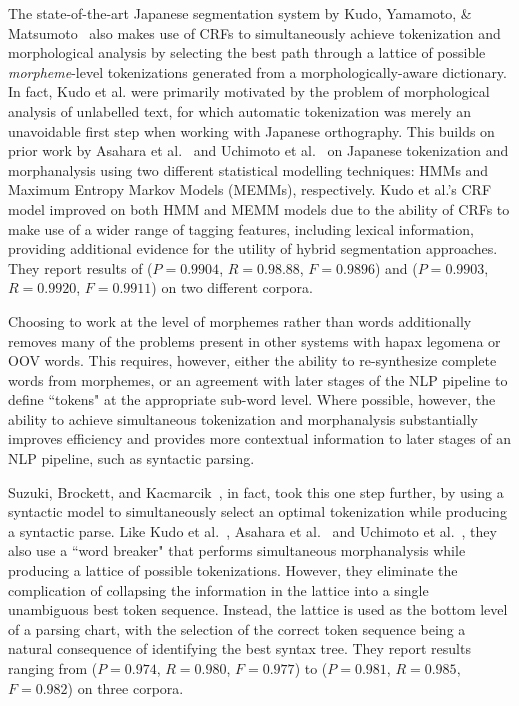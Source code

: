 The state-of-the-art Japanese segmentation system by Kudo, Yamamoto, \& Matsumoto~\cite{kudo04} also makes use of CRFs to simultaneously achieve tokenization and morphological analysis by selecting the best path through a lattice of possible \textit{morpheme}-level tokenizations generated from a morphologically-aware dictionary. In fact, Kudo et al. were primarily motivated by the problem of morphological analysis of unlabelled text, for which automatic tokenization was merely an unavoidable first step when working with Japanese orthography. This builds on prior work by Asahara et al.~\cite{asahara00} and Uchimoto et al.~\cite{uchimoto01} on Japanese tokenization and morphanalysis using two different statistical modelling techniques: HMMs and Maximum Entropy Markov Models (MEMMs), respectively. Kudo et al.'s CRF model improved on both HMM and MEMM models due to the ability of CRFs to make use of a wider range of tagging features, including lexical information, providing additional evidence for the utility of hybrid segmentation approaches. They report results of ($P = 0.9904$, $R = 0.98.88$, $F = 0.9896$) and ($P = 0.9903$, $R = 0.9920$, $F = 0.9911$) on two different corpora.

Choosing to work at the level of morphemes rather than words additionally removes many of the problems present in other systems with hapax legomena or OOV words. This requires, however, either the ability to re-synthesize complete words from morphemes, or an agreement with later stages of the NLP pipeline to define ``tokens" at the appropriate sub-word level. Where possible, however, the ability to achieve simultaneous tokenization and morphanalysis substantially improves efficiency and provides more contextual information to later stages of an NLP pipeline, such as syntactic parsing.

Suzuki, Brockett, and Kacmarcik~\cite{suzuki00}, in fact, took this one step further, by using a syntactic model to simultaneously select an optimal tokenization while producing a syntactic parse. Like Kudo et al.~\cite{kudo04}, Asahara et al.~\cite{asahara00} and Uchimoto et al.~\cite{uchimoto01}, they also use a ``word breaker" that performs simultaneous morphanalysis while producing a lattice of possible tokenizations. However, they eliminate the complication of collapsing the information in the lattice into a single unambiguous best token sequence. Instead, the lattice is used as the bottom level of a parsing chart, with the selection of the correct token sequence being a natural consequence of identifying the best syntax tree. They report results ranging from ($P = 0.974$, $R = 0.980$, $F = 0.977$) to ($P = 0.981$, $R = 0.985$, $F = 0.982$) on three corpora.

